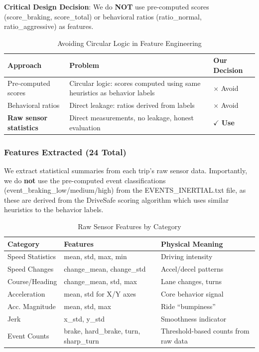 \documentclass[11pt,a4paper]{article}
\begin{document}
\textbf{Critical Design Decision}: We do \textbf{NOT} use pre-computed scores (score\_braking, score\_total) or behavioral ratios (ratio\_normal, ratio\_aggressive) as features.

\begin{table}[H]
\centering
\caption{Avoiding Circular Logic in Feature Engineering}
\begin{tabular}{p{4cm}p{5cm}p{3cm}}
\toprule
\textbf{Approach} & \textbf{Problem} & \textbf{Our Decision} \\
\midrule
Pre-computed scores & Circular logic: scores computed using same heuristics as behavior labels & $\times$ Avoid \\
Behavioral ratios & Direct leakage: ratios derived from labels & $\times$ Avoid \\
\textbf{Raw sensor statistics} & Direct measurements, no leakage, honest evaluation & $\checkmark$ \textbf{Use} \\
\bottomrule
\end{tabular}
\end{table}

\subsubsection{Features Extracted (24 Total)}

We extract statistical summaries from each trip's raw sensor data. Importantly, we do \textbf{not} use the pre-computed event classifications (event\_braking\_low/medium/high) from the EVENTS\_INERTIAL.txt file, as these are derived from the DriveSafe scoring algorithm which uses similar heuristics to the behavior labels.

\begin{table}[H]
\centering
\caption{Raw Sensor Features by Category}
\begin{tabular}{p{3cm}p{5cm}p{4.5cm}}
\toprule
\textbf{Category} & \textbf{Features} & \textbf{Physical Meaning} \\
\midrule
Speed Statistics & mean, std, max, min & Driving intensity \\
Speed Changes & change\_mean, change\_std & Accel/decel patterns \\
Course/Heading & change\_mean, std, max & Lane changes, turns \\
Acceleration & mean, std for X/Y axes & Core behavior signal \\
Acc. Magnitude & mean, std, max & Ride ``bumpiness'' \\
Jerk & x\_std, y\_std & Smoothness indicator \\
Event Counts & brake, hard\_brake, turn, sharp\_turn & Threshold-based counts from raw data \\
\bottomrule
\end{tabular}
\end{table}
\end{document}
